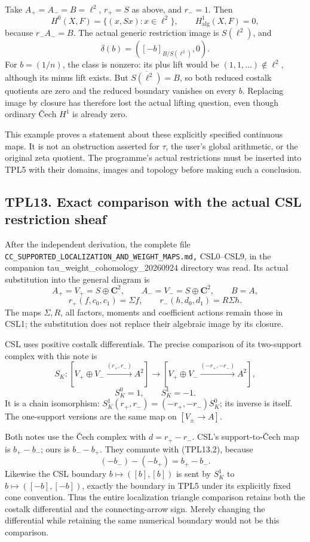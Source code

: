 Take \(A_+=A_-=B=\ell^2\), \(r_+=S\) as above, and \(r_-=1\). Then \[
H^0(X,F)=\{(x,Sx):x\in\ell^2\},\qquad H^1_{\mathrm{alg}}(X,F)=0,
\tag{TPL12.1}
\] because \(r_-A_-=B\). The actual generic restriction image is
\(S(\ell^2)\), and \[
\delta(b)=([-b]_{B/S(\ell^2)},0).
\tag{TPL12.2}
\] For \(b=(1/n)\), the class is nonzero: its plus lift would be
\((1,1,\ldots)\notin\ell^2\), although its minus lift exists. But
\(\overline{S(\ell^2)}=B\), so both reduced costalk quotients are zero
and the reduced boundary vanishes on every \(b\). Replacing image by
closure has therefore lost the actual lifting question, even though
ordinary Čech \(H^1\) is already zero.

This example proves a statement about these explicitly specified
continuous maps. It is not an obstruction asserted for \(\tau\), the
user's global arithmetic, or the original zeta quotient. The programme's
actual restrictions must be inserted into TPL5 with their domains,
images and topology before making such a conclusion.

\subsection{TPL13. Exact comparison with the actual CSL restriction
sheaf}\label{tpl13.-exact-comparison-with-the-actual-csl-restriction-sheaf}

After the independent derivation, the complete file
\nolinkurl{CC_SUPPORTED_LOCALIZATION_AND_WEIGHT_MAPS.md,} CSL0--CSL9, in
the companion tau\_weight\_cohomology\_20260924 directory was read. Its
actual substitution into the general diagram is \[
A_+=V_+=S\oplus\mathbf C^2,\qquad
A_-=V_-=S\oplus\mathbf C^2,\qquad B=A,
\] \[
r_+(f,c_0,c_1)=\Sigma f,\qquad
r_-(h,d_0,d_1)=R\Sigma h.
\tag{TPL13.1}
\] The maps \(\Sigma,R\), all factors, moments and coefficient actions
remain those in CSL1; the substitution does not replace their algebraic
image by its closure.

CSL uses positive costalk differentials. The precise comparison of its
two-support complex with this note is \[
S_K:[V_+\oplus V_-\xrightarrow{(r_+,r_-)}A^2]
\longrightarrow
[V_+\oplus V_-\xrightarrow{(-r_+,-r_-)}A^2],
\] \[
S_K^0=1,\qquad S_K^1=-1.
\tag{TPL13.2}
\] It is a chain isomorphism: \(S_K^1(r_+,r_-)=(-r_+,-r_-)S_K^0\); its
inverse is itself. The one-support versions are the same map on
\([V_\pm\to A]\).

Both notes use the Čech complex with \(d=r_+-r_-\). CSL's
support-to-Čech map is \(b_+-b_-\); ours is \(b_--b_+\). They commute
with (TPL13.2), because \[
(-b_-)-(-b_+)=b_+-b_-.
\tag{TPL13.3}
\] Likewise the CSL boundary \(b\mapsto([b],[b])\) is sent by \(S_K^1\)
to \(b\mapsto([-b],[-b])\), exactly the boundary in TPL5 under its
explicitly fixed cone convention. Thus the entire localization triangle
comparison retains both the costalk differential and the
connecting-arrow sign. Merely changing the differential while retaining
the same numerical boundary would not be this comparison.

